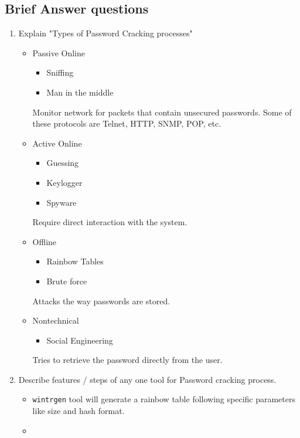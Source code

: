 \subsection{Brief Answer questions}
\begin{enumerate}
    \item Explain "Types of Password Cracking processes"
    \begin{itemize}
        \item Passive Online
        \begin{itemize}
            \item Sniffing
            \item Man in the middle
        \end{itemize}
        Monitor network for packets that contain unsecured passwords.
        Some of these protocols are Telnet, HTTP, SNMP, POP, etc.
        \item Active Online
        \begin{itemize}
            \item Guessing
            \item Keylogger
            \item Spyware
        \end{itemize}
        Require direct interaction with the system.
        \item Offline
        \begin{itemize}
            \item Rainbow Tables
            \item Brute force
        \end{itemize}
        Attacks the way passwords are stored.
        \item Nontechnical
        \begin{itemize}
            \item Social Engineering
        \end{itemize}
        Tries to retrieve the password directly from the user.
    \end{itemize}
    \item Describe features / steps of any one tool for Password cracking process.
    \begin{itemize}
        \item \verb|wintrgen| tool will generate a rainbow table following specific parameters like size and hash format.
        \item 
    \end{itemize}
    
\end{enumerate}

